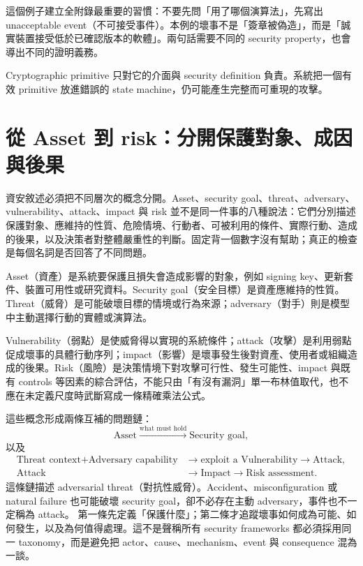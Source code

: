 \documentclass[11pt,a4paper,oneside,openany]{book}
\begin{document}
這個例子建立全附錄最重要的習慣：不要先問「用了哪個演算法」，先寫出 unacceptable event（不可接受事件）。本例的壞事不是「簽章被偽造」，而是「誠實裝置接受低於已確認版本的軟體」。兩句話需要不同的 security property，也會導出不同的證明義務。

\begin{coreintuition}
Cryptographic primitive 只對它的介面與 security definition 負責。系統把一個有效 primitive 放進錯誤的 state machine，仍可能產生完整而可重現的攻擊。
\end{coreintuition}

\section{從 Asset 到 risk：分開保護對象、成因與後果}
資安敘述必須把不同層次的概念分開。Asset、security goal、threat、adversary、vulnerability、attack、impact 與 risk 並不是同一件事的八種說法：它們分別描述保護對象、應維持的性質、危險情境、行動者、可被利用的條件、實際行動、造成的後果，以及決策者對整體嚴重性的判斷。固定背一個數字沒有幫助；真正的檢查是每個名詞是否回答了不同問題。

\begin{definition}
Asset（資產）是系統要保護且損失會造成影響的對象，例如 signing key、更新套件、裝置可用性或研究資料。Security goal（安全目標）是資產應維持的性質。Threat（威脅）是可能破壞目標的情境或行為來源；adversary（對手）則是模型中主動選擇行動的實體或演算法。
\end{definition}

\begin{definition}
Vulnerability（弱點）是使威脅得以實現的系統條件；attack（攻擊）是利用弱點促成壞事的具體行動序列；impact（影響）是壞事發生後對資產、使用者或組織造成的後果。Risk（風險）是決策情境下對攻擊可行性、發生可能性、impact 與既有 controls 等因素的綜合評估，不能只由「有沒有漏洞」單一布林值取代，也不應在未定義尺度時武斷寫成一條精確乘法公式。
\end{definition}

這些概念形成兩條互補的問題鏈：
\[
 \text{Asset}\xrightarrow{\text{what must hold}}\text{Security goal},
\]
以及
\[
 \begin{aligned}
  \text{Threat context}+\text{Adversary capability}
    &\longrightarrow \text{exploit a Vulnerability}\longrightarrow\text{Attack},\\
  \text{Attack}&\longrightarrow\text{Impact}\longrightarrow\text{Risk assessment}.
 \end{aligned}
\]
這條鏈描述 adversarial threat（對抗性威脅）。Accident、misconfiguration 或 natural failure 也可能破壞 security goal，卻不必存在主動 adversary，事件也不一定稱為 attack。
第一條先定義「保護什麼」；第二條才追蹤壞事如何成為可能、如何發生，以及為何值得處理。這不是聲稱所有 security frameworks 都必須採用同一 taxonomy，而是避免把 actor、cause、mechanism、event 與 consequence 混為一談。
\end{document}
